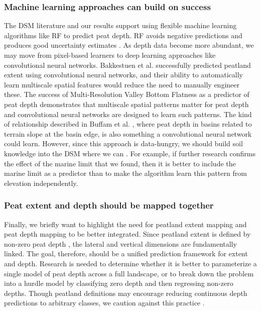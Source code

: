 \documentclass[soil, manuscript]{copernicus}
\begin{document}
\subsubsection{Machine learning approaches can build on success}

The DSM literature and our results support using flexible machine learning algorithms like RF to predict peat depth.
RF avoids negative predictions \citep[c.f.][]{kogantiMappingPeatDepth2023} and produces good uncertainty estimates \citep[our study,][]{vaysseUsingQuantileRegression2017, takoutsingComparingPredictionPerformance2022}.
As depth data become more abundant, we may move from pixel-based learners to deep learning approaches like convolutional neural networks.
Bakkestuen et al. \citeyearpar{bakkestuenDelineationWetlandAreas2023} successfully predicted peatland extent using convolutional neural networks, and their ability to automatically learn multiscale spatial features would reduce the need to manually engineer these.
The success of Multi-Resolution Valley Bottom Flatness as a predictor of peat depth demonstrates that multiscale spatial patterns matter for peat depth and convolutional neural networks are designed to learn such patterns.
The kind of relationship described in Buffam et al. \citeyearpar{buffamFillingHolesRegional2010}, where peat depth in basins related to terrain slope at the basin edge, is also something a convolutional neural network could learn.
However, since this approach is data-hungry, we should build soil knowledge into the DSM where we can \citep{minasnySoilScienceInformedMachine2024}.
For example, if further research confirms the effect of the marine limit that we found, then it is better to include the marine limit as a predictor than to make the algorithm learn this pattern from elevation independently.

\subsubsection{Peat extent and depth should be mapped together}

Finally, we briefly want to highlight the need for peatland extent mapping and peat depth mapping to be better integrated.
Since peatland extent is defined by non-zero peat depth \citep[the specific threshold varies by definition,][]{minasnyMappingMonitoringPeatland2024}, the lateral and vertical dimensions are fundamentally linked.
The goal, therefore, should be a unified prediction framework for extent and depth.
Research is needed to determine whether it is better to parameterize a single model of peat depth across a full landscape, or to break down the problem into a hurdle model by classifying zero depth and then regressing non-zero depths.
Though peatland definitions may encourage reducing continuous depth predictions to arbitrary classes, we caution against this practice \citep[as in][]{ivanovsModelingGeospatialDistribution2024, karjalainenComparisonTwoGammaray2025}.
\end{document}
